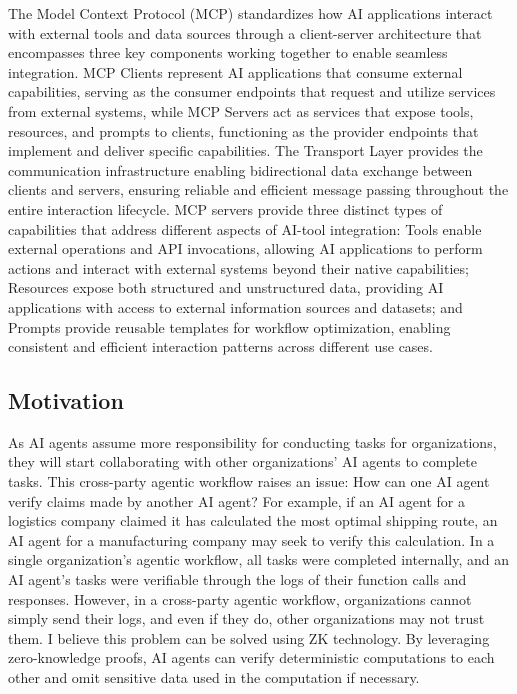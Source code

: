 \documentclass[11pt]{article}
\begin{document}
The Model Context Protocol (MCP) standardizes how AI applications interact with external tools and data sources through a client-server architecture that encompasses three key components working together to enable seamless integration. MCP Clients represent AI applications that consume external capabilities, serving as the consumer endpoints that request and utilize services from external systems, while MCP Servers act as services that expose tools, resources, and prompts to clients, functioning as the provider endpoints that implement and deliver specific capabilities. The Transport Layer provides the communication infrastructure enabling bidirectional data exchange between clients and servers, ensuring reliable and efficient message passing throughout the entire interaction lifecycle. MCP servers provide three distinct types of capabilities that address different aspects of AI-tool integration: Tools enable external operations and API invocations, allowing AI applications to perform actions and interact with external systems beyond their native capabilities; Resources expose both structured and unstructured data, providing AI applications with access to external information sources and datasets; and Prompts provide reusable templates for workflow optimization, enabling consistent and efficient interaction patterns across different use cases.

\subsection{Motivation}

As AI agents assume more responsibility for conducting tasks for organizations, they will start collaborating with other organizations' AI agents to complete tasks. This cross-party agentic workflow raises an issue: How can one AI agent verify claims made by another AI agent? For example, if an AI agent for a logistics company claimed it has calculated the most optimal shipping route, an AI agent for a manufacturing company may seek to verify this calculation. In a single organization's agentic workflow, all tasks were completed internally, and an AI agent's tasks were verifiable through the logs of their function calls and responses. However, in a cross-party agentic workflow, organizations cannot simply send their logs, and even if they do, other organizations may not trust them. I believe this problem can be solved using ZK technology. By leveraging zero-knowledge proofs, AI agents can verify deterministic computations to each other and omit sensitive data used in the computation if necessary. 
\end{document}
